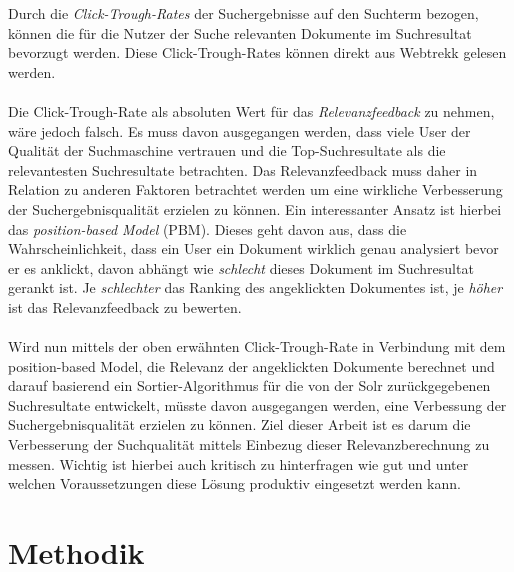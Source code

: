 Durch die \textit{Click-Trough-Rates} der Suchergebnisse auf den Suchterm bezogen, können die für die Nutzer der Suche relevanten Dokumente im Suchresultat bevorzugt werden. Diese Click-Trough-Rates können direkt aus Webtrekk gelesen werden. 
\\
\\
Die Click-Trough-Rate als absoluten Wert für das \textit{Relevanzfeedback} zu nehmen, wäre jedoch falsch. Es muss davon ausgegangen werden, dass viele User der Qualität der Suchmaschine vertrauen und die Top-Suchresultate als die relevantesten Suchresultate betrachten. \cite{Joachims} Das Relevanzfeedback muss daher in Relation zu anderen Faktoren betrachtet werden um eine wirkliche Verbesserung der Suchergebnisqualität erzielen zu können. Ein interessanter Ansatz ist hierbei das \textit{position-based Model} (PBM). \cite{chuklin2015} Dieses geht davon aus, dass die Wahrscheinlichkeit, dass ein User ein Dokument wirklich genau analysiert bevor er es anklickt, davon abhängt wie \textit{schlecht} dieses Dokument im Suchresultat gerankt ist. Je \textit{schlechter} das Ranking des angeklickten Dokumentes ist, je \textit{höher} ist das Relevanzfeedback zu bewerten.
\\
\\
Wird nun mittels der oben erwähnten Click-Trough-Rate in Verbindung mit dem position-based Model, die Relevanz der angeklickten Dokumente berechnet und darauf basierend ein Sortier-Algorithmus für die von der Solr zurückgegebenen Suchresultate entwickelt, müsste davon ausgegangen werden, eine Verbessung der Suchergebnisqualität erzielen zu können. Ziel dieser Arbeit ist es darum die Verbesserung der Suchqualität mittels Einbezug dieser Relevanzberechnung zu messen. Wichtig ist hierbei auch kritisch zu hinterfragen wie gut und unter welchen Voraussetzungen diese Lösung produktiv eingesetzt werden kann.

\section{Methodik}
\label{sec:Einfuehrung:Methodik}

